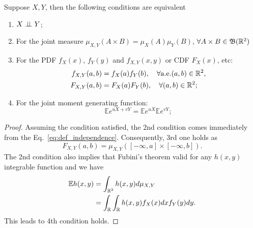 \begin{theorem}
Suppose $X,Y$, then the following conditions are equivalent
\begin{enumerate}
	\item  $X\perp\!\!\!\perp Y$;
	\item For the joint measure $\mu_{X,Y}(A\times B)=\mu_X(A)\mu_Y(B)$, $\forall A\times B\in\mathfrak{B}(\mathbb{R}^2)$
	\item For the PDF $f_X(x)$, $f_Y(y)$ and $f_{X,Y}(x,y)$ or CDF $F_X(x)$, etc:
	\begin{equation}
	\begin{aligned}
	f_{X,Y}(a,b) &= f_X(a)f_Y(b),\quad \forall\text{a.e.} (a,b)\in\mathbb{R}^2,\\
	F_{X,Y}(a,b) &= F_X(a)F_Y(b),\quad \forall (a,b)\in\mathbb{R}^2;
	\end{aligned}
	\end{equation}
	\item For the joint moment generating function:
	\begin{equation}
	\mathbb{E}e^{uX+vY}=\mathbb{E}e^{uX}\mathbb{E}e^{vY};
	\end{equation}
\end{enumerate}
\end{theorem}
\begin{proof}
Assuming the condition satisfied, the 2nd condition comes immediately from the Eq.~\ref{eq:def_independence}. Consequently, 3rd one holds as 
\begin{equation}
F_{X,Y}(a,b) = \mu_{X,Y}([-\infty,a]\times[-\infty,b]).
\end{equation}
The 2nd condition also implies that Fubini's theorem valid for any $h(x,y)$ integrable function and we have
\begin{equation}
\begin{aligned}
\mathbb{E}h(x,y)&=\int_{\mathbb{R}^2}h(x,y)d\mu_{X,Y}\\
&=\int_{\mathbb{R}} \int_{\mathbb{R}} h(x,y)f_X(x)dx f_Y(y)dy.
\end{aligned}
\end{equation}
This leads to 4th condition holds.
\end{proof}

